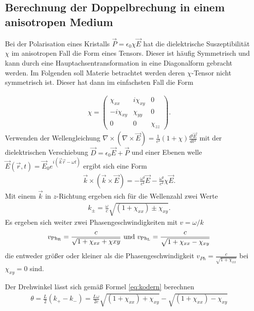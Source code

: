 \subsection{Berechnung der Doppelbrechung in einem anisotropen Medium \cite{man_a}}
\label{sec:anisotrop}
Bei der Polarisation eines Kristalls $\vec{P} = \epsilon_0 \chi \vec{E}$ hat die dielektrische Suszeptibilität $\chi$
im anisotropen Fall die Form eines Tensors. Dieser ist häufig Symmetrisch und kann durch eine Hauptachsentransformation
in eine Diagonalform gebracht werden. Im Folgenden soll Materie betrachtet werden deren $\chi$-Tensor nicht symmetrisch ist.
Dieser hat dann im einfachsten Fall die Form

\begin{align}
	\chi = %
	\begin{pmatrix}
		\chi_{xx}     & i \chi_{xy} & 0         \\
		- i \chi_{xy} & \chi_{yy}   & 0         \\
		0             & 0           & \chi_{zz}
	\end{pmatrix}.
	\label{eq:chi}
\end{align}
Verwenden der Wellengleichung $\nabla \times (\nabla \times \vec{E}) = \frac{1}{c²}(1 + \chi)\frac{d² \vec{E}}{d t²}$
mit der dielektrischen Verschiebung $\vec{D} = \epsilon_0 \vec{E}+ \vec{P}$ und einer Ebenen welle
$\vec{E}(\vec{r},t) = \vec{E}_0 e^{i(\vec{k}\vec{r} - \omega t)}$ ergibt sich eine Form
\begin{align}
	\vec{k} \times (\vec{k} \times \vec{E})= -\frac{\omega²}{c²} \vec{E}- \frac{\omega²}{c²}\chi \vec{E}.
\end{align}
Mit einem $\vec{k}$ in $z$-Richtung ergeben sich für die Wellenzahl zwei Werte
\begin{align}
	k_{\pm} = \frac{\omega}{c}\sqrt{(1+\chi_{xx})\pm \chi_{xy}}.
\end{align}
Es ergeben sich weiter zwei Phasengeschwindigkeiten mit $v = \omega/ k$
\begin{align}
	v_{\text{Ph}_\text{R}} = \frac{c}{\sqrt{1+\chi_{xx}+\chi{xy}}} \text{ und } v_{\text{Ph}_\text{L}} = \frac{c}{\sqrt{1+\chi_{xx}-\chi_{xy}}}
\end{align}
die entweder größer oder kleiner als die Phasengeschwindigkeit $v_{Ph}= \frac{c}{\sqrt{1+\chi_{xx}}}$ bei $\chi_{xy} = 0$ sind. %

Der Drehwinkel lässt sich gemäß Formel \eqref{eq:kodern} berechnen
\begin{align}
	\theta = \frac{L}{2}(k_+ -k_-) = \frac{L\omega}{2c}{ \sqrt{(1+ \chi_{xx} )+ \chi_{xy}} - \sqrt{(1+ \chi_{xx} )-\chi_{xy}} }
\end{align}

